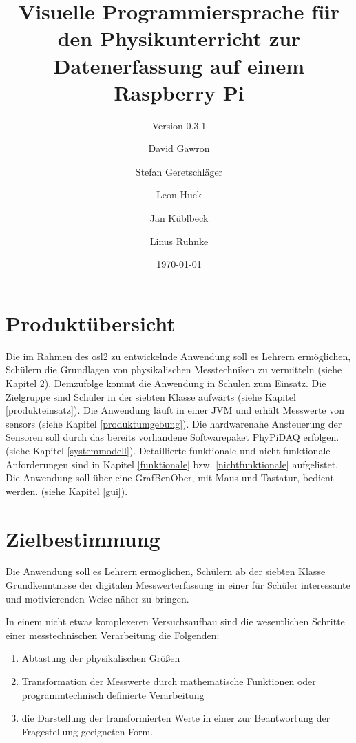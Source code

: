 \documentclass[parskip=full]{scrartcl}
\title{Visuelle Programmiersprache für den Physikunterricht zur Datenerfassung auf einem Raspberry Pi}
\subtitle{Version 0.3.1}
\author{David Gawron \and Stefan Geretschläger \and Leon Huck \and Jan Küblbeck \and Linus Ruhnke}
\date{\today}
\begin{document}
\maketitle

\newpage
\tableofcontents 					%
\newpage

\section{Produktübersicht} %

Die im Rahmen des \gls{osl2} zu entwickelnde Anwendung soll es Lehrern ermöglichen, Schülern die Grundlagen von physikalischen Messtechniken zu vermitteln (siehe Kapitel \ref{zielbestimmung}).
Demzufolge kommt die Anwendung in Schulen zum Einsatz. 
Die Zielgruppe sind Schüler in der siebten Klasse aufwärts (siehe Kapitel \ref{produkteinsatz}).
Die Anwendung läuft in einer \gls{JVM} und erhält Messwerte von \glspl{sensor} (siehe Kapitel \ref{produktumgebung}). 
Die hardwarenahe Ansteuerung der Sensoren soll durch das bereits vorhandene Softwarepaket \gls{PhyPiDAQ} erfolgen. (siehe Kapitel \ref{systemmodell}).
Detaillierte funktionale und nicht funktionale Anforderungen sind in Kapitel \ref{funktionale} bzw. \ref{nichtfunktionale} aufgelistet.
Die Anwendung soll über eine \gls{GrafBenOber}, mit Maus und Tastatur, bedient werden. (siehe Kapitel \ref{gui}).

\clearpage
\section{Zielbestimmung}\label{zielbestimmung}

Die Anwendung soll es Lehrern ermöglichen, Schülern ab der siebten Klasse Grundkenntnisse der digitalen Messwerterfassung in einer für Schüler interessante und motivierenden Weise näher zu bringen. 

In einem nicht etwas komplexeren Versuchsaufbau sind die wesentlichen Schritte einer messtechnischen Verarbeitung die Folgenden: 

\begin{enumerate}
	\item Abtastung der physikalischen Größen
	
	\item Transformation der Messwerte durch mathematische Funktionen oder programmtechnisch definierte Verarbeitung
	
	\item die Darstellung der transformierten Werte in einer zur Beantwortung der Fragestellung geeigneten Form.
	
\end{enumerate}
\end{document}
